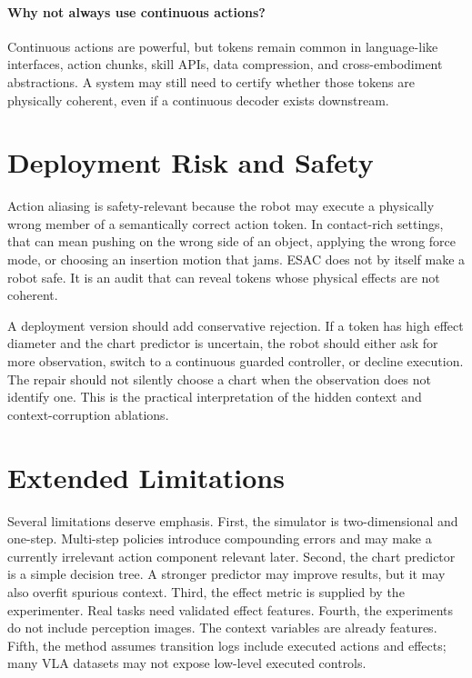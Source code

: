 \documentclass{article}
\begin{document}
\paragraph{Why not always use continuous actions?}
Continuous actions are powerful, but tokens remain common in language-like
interfaces, action chunks, skill APIs, data compression, and cross-embodiment
abstractions. A system may still need to certify whether those tokens are
physically coherent, even if a continuous decoder exists downstream.

\section{Deployment Risk and Safety}

Action aliasing is safety-relevant because the robot may execute a physically
wrong member of a semantically correct action token. In contact-rich settings,
that can mean pushing on the wrong side of an object, applying the wrong force
mode, or choosing an insertion motion that jams. ESAC does not by itself make a
robot safe. It is an audit that can reveal tokens whose physical effects are
not coherent.

A deployment version should add conservative rejection. If a token has high
effect diameter and the chart predictor is uncertain, the robot should either
ask for more observation, switch to a continuous guarded controller, or decline
execution. The repair should not silently choose a chart when the observation
does not identify one. This is the practical interpretation of the hidden
context and context-corruption ablations.

\section{Extended Limitations}

Several limitations deserve emphasis. First, the simulator is two-dimensional
and one-step. Multi-step policies introduce compounding errors and may make a
currently irrelevant action component relevant later. Second, the chart
predictor is a simple decision tree. A stronger predictor may improve results,
but it may also overfit spurious context. Third, the effect metric is supplied
by the experimenter. Real tasks need validated effect features. Fourth, the
experiments do not include perception images. The context variables are already
features. Fifth, the method assumes transition logs include executed actions
and effects; many VLA datasets may not expose low-level executed controls.
\end{document}
